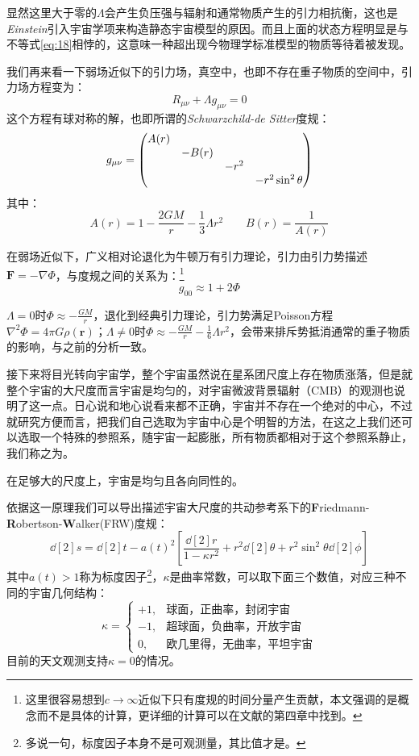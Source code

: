 \documentclass{ctexart}
\newcommand{\dotemph}[1]{\CJKunderdot{#1}}
\begin{document}
	显然这里大于零的$\Lambda$会产生负压强与辐射和通常物质产生的引力相抗衡，这也是\textit{Einstein}引入宇宙学项来构造静态宇宙模型的原因。而且上面的状态方程明显是与不等式\ref{eq:18}相悖的，这意味一种超出现今物理学标准模型的物质等待着被发现。
	
	我们再来看一下弱场近似下的引力场，真空中，也即不存在重子物质的空间中，引力场方程变为：
	\begin{equation}
		R_{\mu\nu}+\Lambda g_{\mu\nu}=0
	\end{equation}
	这个方程有球对称的解，也即所谓的\textit{Schwarzchild-de Sitter}度规：
	\begin{equation}
		g_{\mu\nu}=\mqty(\dmat{A(r),-B(r),-r^2,-r^2\sin^2{\theta}})
	\end{equation}
	其中：
	\begin{equation*}
		A(r)=1-\frac{2GM}{r}-\frac{1}{3}\Lambda r^2\qquad B(r)=\frac{1}{A(r)}
	\end{equation*}
	
	在弱场近似下，广义相对论退化为牛顿万有引力理论，引力由引力势描述$\mathbf{F}=-\nabla \Phi$，与度规之间的关系为：\footnote{这里很容易想到$c\to\infty$近似下只有度规的时间分量产生贡献，本文强调的是概念而不是具体的计算，更详细的计算可以在文献\cite{GR1}的第四章中找到。}
	\begin{equation}
		g_{00}\approx 1+2\Phi
	\end{equation}

	$\Lambda=0$时$\Phi\approx -\frac{GM}{r}$，退化到经典引力理论，引力势满足Poisson方程$\nabla^2\Phi=4\pi G\rho(\mathbf{r})$；$\Lambda\neq 0$时$\Phi\approx -\frac{GM}{r}-\frac{1}{6}\Lambda r^2$，会带来排斥势抵消通常的重子物质的影响，与之前的分析一致。
	
	接下来将目光转向宇宙学，整个宇宙虽然说在星系团尺度上存在物质涨落，但是就整个宇宙的大尺度而言宇宙是均匀的，对宇宙微波背景辐射（CMB）的观测也说明了这一点。日心说和地心说看来都不正确，宇宙并不存在一个绝对的中心，不过就研究方便而言，把我们自己选取为宇宙中心是个明智的方法，在这之上我们还可以选取一个特殊的参照系，随宇宙一起膨胀，所有物质都相对于这个参照系静止，我们称之为\dotemph{共动参考系}。
	\begin{tcolorbox}[colback=red!5!white,colframe=red!75!black,title=宇宙学原理]
		在足够大的尺度上，宇宙是均匀且各向同性的。
	\end{tcolorbox}
	依据这一原理我们可以导出描述宇宙大尺度的共动参考系下的\textbf{F}riedmann-\textbf{R}obertson-\textbf{W}alker(FRW)度规：\cite{Weinberg}
	\begin{equation}
		\boxed{
			\dd[2] s=\dd[2] t-a(t)^2\left[\frac{\dd[2]r}{1-\kappa r^2}+r^2\dd[2]\theta+r^2\sin^2\theta\dd[2]\phi \right]
	}
	\end{equation}
	其中$a(t)>1$称为标度因子\footnote{多说一句，标度因子本身不是可观测量，其比值才是。}，$\kappa$是曲率常数，可以取下面三个数值，对应三种不同的宇宙几何结构：
	\begin{equation}
		\kappa =\begin{cases}
			+1,&\text{球面，正曲率，封闭宇宙}\\
			-1,&\text{超球面，负曲率，开放宇宙}\\
			0,&\text{欧几里得，无曲率，平坦宇宙}
		\end{cases}
	\end{equation}
	目前的天文观测支持$\kappa=0$的情况。
	
\end{document}
